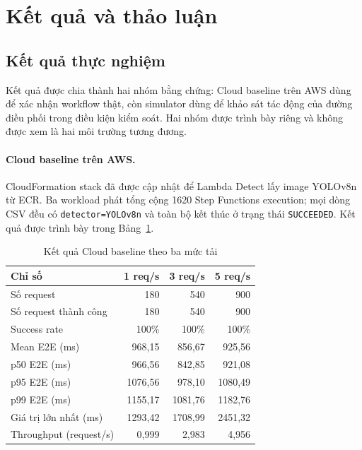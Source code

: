 \section{Kết quả và thảo luận}

\subsection{Kết quả thực nghiệm}

Kết quả được chia thành hai nhóm bằng chứng: Cloud baseline trên AWS dùng để xác
nhận workflow thật, còn simulator dùng để khảo sát tác động của đường điều phối
trong điều kiện kiểm soát. Hai nhóm được trình bày riêng và không được xem là hai
môi trường tương đương.

\paragraph{Cloud baseline trên AWS.}

CloudFormation stack đã được cập nhật để Lambda Detect lấy image YOLOv8n từ ECR.
Ba workload phát tổng cộng 1620 Step Functions execution; mọi dòng CSV đều có
\texttt{detector=YOLOv8n} và toàn bộ kết thúc ở trạng thái
\texttt{SUCCEEDED}. Kết quả được trình bày trong Bảng~\ref{tab:aws-results}.

\begin{table}[htbp]
    \centering
    \caption{Kết quả Cloud baseline theo ba mức tải}
    \label{tab:aws-results}
    \begin{tabular}{|l|r|r|r|}
        \hline
        \textbf{Chỉ số} & \textbf{1 req/s} & \textbf{3 req/s}
        & \textbf{5 req/s} \\ \hline
        Số request & 180 & 540 & 900 \\ \hline
        Số request thành công & 180 & 540 & 900 \\ \hline
        Success rate & 100\% & 100\% & 100\% \\ \hline
        Mean E2E (ms) & 968,15 & 856,67 & 925,56 \\ \hline
        p50 E2E (ms) & 966,56 & 842,85 & 921,08 \\ \hline
        p95 E2E (ms) & 1076,56 & 978,10 & 1080,49 \\ \hline
        p99 E2E (ms) & 1155,17 & 1081,76 & 1182,76 \\ \hline
        Giá trị lớn nhất (ms) & 1293,42 & 1708,99 & 2451,32 \\ \hline
        Throughput (request/s) & 0,999 & 2,983 & 4,956 \\ \hline
    \end{tabular}
\end{table}

